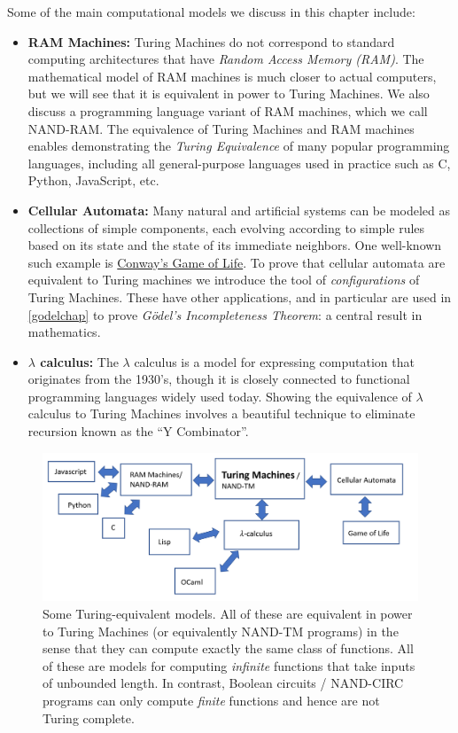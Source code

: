Some of the main computational models we discuss in this chapter
include:

\begin{itemize}
\item
  \textbf{RAM Machines:} Turing Machines do not correspond to standard
  computing architectures that have \emph{Random Access Memory (RAM)}.
  The mathematical model of RAM machines is much closer to actual
  computers, but we will see that it is equivalent in power to Turing
  Machines. We also discuss a programming language variant of RAM
  machines, which we call NAND-RAM. The equivalence of Turing Machines
  and RAM machines enables demonstrating the \emph{Turing Equivalence}
  of many popular programming languages, including all general-purpose
  languages used in practice such as C, Python, JavaScript, etc.
\item
  \textbf{Cellular Automata:} Many natural and artificial systems can be
  modeled as collections of simple components, each evolving according
  to simple rules based on its state and the state of its immediate
  neighbors. One well-known such example is
  \href{https://en.wikipedia.org/wiki/Conway\%27s_Game_of_Life}{Conway's
  Game of Life}. To prove that cellular automata are equivalent to
  Turing machines we introduce the tool of \emph{configurations} of
  Turing Machines. These have other applications, and in particular are
  used in \cref{godelchap} to prove \emph{Gödel's Incompleteness
  Theorem}: a central result in mathematics.
\item
  \textbf{\(\lambda\) calculus:} The \(\lambda\) calculus is a model for
  expressing computation that originates from the 1930's, though it is
  closely connected to functional programming languages widely used
  today. Showing the equivalence of \(\lambda\) calculus to Turing
  Machines involves a beautiful technique to eliminate recursion known
  as the ``Y Combinator''.
\end{itemize}


\begin{figure}
\centering
\includegraphics[width=\textwidth, height=0.25\paperheight, keepaspectratio]{../figure/turingcomplete.png}
\caption{Some Turing-equivalent models. All of these are equivalent in
power to Turing Machines (or equivalently NAND-TM programs) in the sense
that they can compute exactly the same class of functions. All of these
are models for computing \emph{infinite} functions that take inputs of
unbounded length. In contrast, Boolean circuits / NAND-CIRC programs can
only compute \emph{finite} functions and hence are not Turing complete.}
\label{turingcompletefig}
\end{figure}

